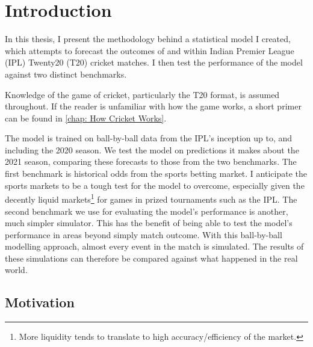 \newcommand{\hsp}{\hspace{20pt}}
\titleformat{\chapter}[hang]{\Huge\bfseries}{\thechapter\hsp\textcolor{gray75}{|}\hsp}{0pt}{\Huge\bfseries}
\chapter{Introduction}


In this thesis, I present the methodology behind a statistical model I created, which attempts to forecast the outcomes of and within\footnotemark{} Indian Premier League (IPL) Twenty20 (T20) cricket matches. I then test the performance of the model against two distinct benchmarks.


Knowledge of the game of cricket, particularly the T20 format, is assumed throughout. If the reader is unfamiliar with how the game works, a short primer can be found in \cref{chap: How Cricket Works}.

The model is trained on ball-by-ball data from the IPL's inception up to, and including the 2020 season. We test the model on predictions it makes about the 2021 season, comparing these forecasts to those from the two benchmarks. The first benchmark is historical odds from the sports betting market. I anticipate the sports markets to be a tough test for the model to overcome, especially given the decently liquid markets\footnote{More liquidity tends to translate to high accuracy/efficiency of the market.} for games in prized tournaments such as the IPL. The second benchmark we use for evaluating the model's performance is another, much simpler simulator. This has the benefit of being able to test the model's performance in areas beyond simply match outcome. With this ball-by-ball modelling approach, almost every event in the match is simulated. The results of these simulations can therefore be compared against what happened in the real world.

\section{Motivation}

